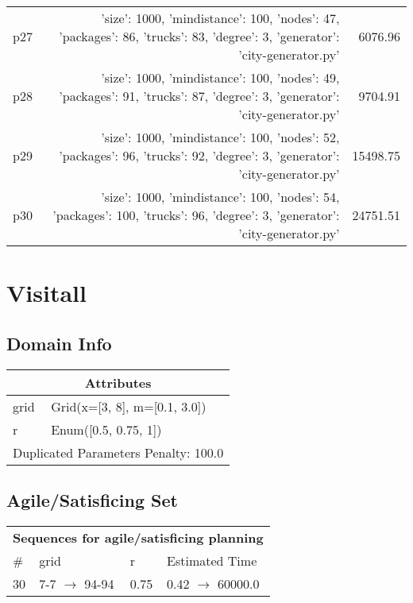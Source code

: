 \documentclass{article}
\begin{document}
\begin{center}
\begin{tabular}{@{}l|r|r@{}}
  p27&{'size': 1000, 'mindistance': 100, 'nodes': 47, 'packages': 86, 'trucks': 83, 'degree': 3, 'generator': 'city-generator.py'}&6076.96\\
  p28&{'size': 1000, 'mindistance': 100, 'nodes': 49, 'packages': 91, 'trucks': 87, 'degree': 3, 'generator': 'city-generator.py'}&9704.91\\
  p29&{'size': 1000, 'mindistance': 100, 'nodes': 52, 'packages': 96, 'trucks': 92, 'degree': 3, 'generator': 'city-generator.py'}&15498.75\\
  p30&{'size': 1000, 'mindistance': 100, 'nodes': 54, 'packages': 100, 'trucks': 96, 'degree': 3, 'generator': 'city-generator.py'}&24751.51
                            \end{tabular}
                            \end{center}
                    
                            \newpage \section{Visitall}
                    \subsection*{Domain Info}

                    \begin{center}
                    \begin{tabular}{@{}p{}p{}@{}}
                    \multicolumn{2}{c}{\bf \large Attributes}\\\midrule
                    grid & Grid(x=[3, 8], m=[0.1, 3.0])\\
r & Enum([0.5, 0.75, 1])
                    
                     \\\midrule
                    \multicolumn{2}{l}{Duplicated Parameters Penalty: 100.0}
                    \end{tabular}
                    \end{center}
                
                         \subsection*{Agile/Satisficing Set}

                        \begin{center}
                        \begin{tabular}{@{}l|l|l|l@{}}
                        \multicolumn{4}{c}{\bf \large Sequences for agile/satisficing planning}\\
                        \# & grid & r & Estimated Time\\\midrule
                        30&7-7 $\rightarrow$ 94-94&0.75&0.42 $\rightarrow$ 60000.0
                        \end{tabular}
                        \end{center}
                    
\end{document}
